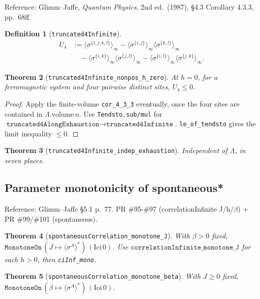 \documentclass[a4paper,11pt]{article}
\newtheorem{theorem}{Theorem}
\newtheorem{definition}[theorem]{Definition}
\begin{document}
Reference: Glimm--Jaffe, \textit{Quantum Physics}, 2nd ed.\ (1987),
\S 4.3 Corollary 4.3.3, pp.\ 68ff.

\begin{definition}[\texttt{truncated4Infinite}]
\begin{align*}
U_4 &:= \langle \sigma^{\{i,j,k,l\}} \rangle_\infty
  - \langle \sigma^{\{i,j\}} \rangle_\infty \langle \sigma^{\{k,l\}} \rangle_\infty \\
  &\quad - \langle \sigma^{\{i,k\}} \rangle_\infty \langle \sigma^{\{j,l\}} \rangle_\infty
  - \langle \sigma^{\{i,l\}} \rangle_\infty \langle \sigma^{\{j,k\}} \rangle_\infty.
\end{align*}
\end{definition}

\begin{theorem}[\texttt{truncated4Infinite\_nonpos\_h\_zero}]
At $h = 0$, for a ferromagnetic system and four pairwise distinct sites,
$U_4 \le 0$.
\end{theorem}

\begin{proof}
Apply the finite-volume \texttt{cor\_4\_3\_3} eventually, once the four sites
are contained in $\Lambda.\text{volume}\,n$. Use \texttt{Tendsto.sub/mul} for
$\texttt{truncated4AlongExhaustion} \to \texttt{truncated4Infinite}$.
\texttt{le\_of\_tendsto} gives the limit inequality $\le 0$.
\end{proof}

\begin{theorem}[\texttt{truncated4Infinite\_indep\_exhaustion}]
Independent of $\Lambda$, in seven places.
\end{theorem}

\subsection{Parameter monotonicity of spontaneous*}

Reference: Glimm--Jaffe \S 5.1 p.\ 77.
PR \#95-\#97 (correlationInfinite J/h/$\beta$) + PR \#99/\#101 (spontaneous).

\begin{theorem}[\texttt{spontaneousCorrelation\_monotone\_J}]
With $\beta > 0$ fixed,
$\texttt{MonotoneOn}\,(J \mapsto \langle \sigma^A \rangle^*)\,(\mathrm{Ici}\,0)$.
Use $\texttt{correlationInfinite\_monotone\_J}$ for each $h > 0$, then
\texttt{ciInf\_mono}.
\end{theorem}

\begin{theorem}[\texttt{spontaneousCorrelation\_monotone\_beta}]
With $J \ge 0$ fixed,
$\texttt{MonotoneOn}\,(\beta \mapsto \langle \sigma^A \rangle^*)\,(\mathrm{Ioi}\,0)$.
\end{theorem}
\end{document}
